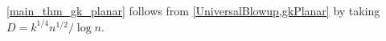 \documentclass{patmorin}
\renewcommand{\leq}{\leqslant}
\begin{document}
\cref{main_thm_gk_planar} follows from \cref{UniversalBlowup,gkPlanar} by taking $D=k^{1/4}n^{1/2}/\log n$.




%


\end{document}

